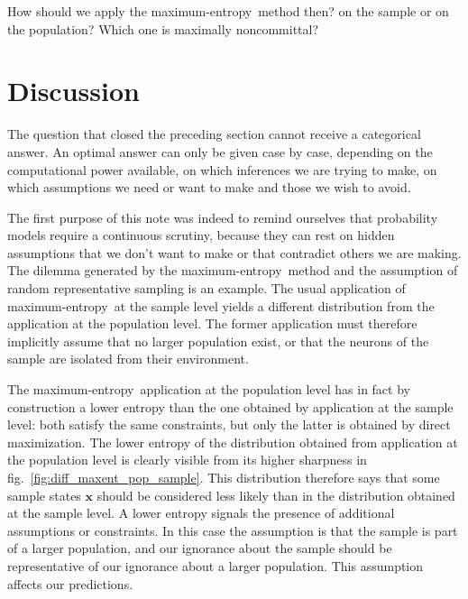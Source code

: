 \documentclass{article}
\theoremstyle{remark}
\theoremstyle{innote}
\renewcommand*{\|}{\mathpunct{|}}%
\newcommand*{\fig}{fig.}%
\theoremstyle{simple}
\newcommand*{\yxx}{x}%
\newcommand*{\yx}{\bm{\yxx}}%
\newcommand*{\me}{maximum-entropy}
\begin{document}
\medskip

How should we apply the \me\ method then? on the sample or on the
population? Which one is maximally noncommittal?

\section{Discussion}
\label{sec:discussion}

The question that closed the preceding section cannot receive a categorical
answer. An optimal answer can only be given case by case, depending on the
computational power available, on which inferences we are trying to make,
on which assumptions we need or want to make and those we wish to avoid.

The first purpose of this note was indeed to remind ourselves that
probability models require a continuous scrutiny, because they can rest on
hidden assumptions that we don't want to make or that contradict others we
are making. The dilemma generated by the \me\ method and the assumption of
random representative sampling is an example. The usual application of \me\
at the sample level yields a different distribution from the application at
the population level. The former application must therefore implicitly
assume that no larger population exist, or that the neurons of the sample
are isolated from their environment.

The \me\ application at the population level has in fact by construction a
lower entropy than the one obtained by application at the sample level:
both satisfy the same constraints, but only the latter is obtained by
direct maximization. The lower entropy of the distribution obtained from
application at the population level is clearly visible from its higher
sharpness in \fig~\ref{fig:diff_maxent_pop_sample}. This distribution
therefore says that some sample states $\yx$ should be considered less
likely than in the distribution obtained at the sample level. A lower
entropy signals the presence of additional assumptions or constraints. In
this case the assumption is that the sample is part of a larger population,
and our ignorance about the sample should be representative of our
ignorance about a larger population. This assumption affects our
predictions.
\end{document}
